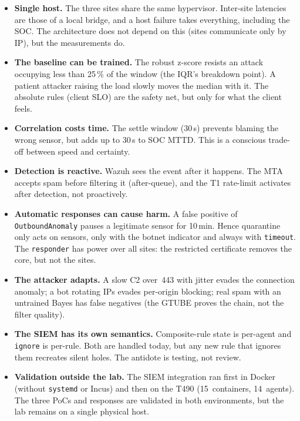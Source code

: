 \documentclass[11pt,a4paper]{article}
\begin{document}
\begin{itemize}
  \item \textbf{Single host.} The three sites share the same hypervisor. Inter-site latencies
    are those of a local bridge, and a host failure takes everything, including the SOC. The
    architecture does not depend on this (sites communicate only by IP), but the measurements
    do.
  \item \textbf{The baseline can be trained.} The robust z-score resists an attack occupying
    less than 25\,\% of the window (the IQR's breakdown point). A patient attacker raising
    the load slowly moves the median with it. The absolute rules (client SLO) are the safety
    net, but only for what the client feels.
  \item \textbf{Correlation costs time.} The settle window (30\,s) prevents blaming the wrong
    sensor, but adds up to 30\,s to SOC MTTD. This is a conscious trade-off between speed
    and certainty.
  \item \textbf{Detection is reactive.} Wazuh sees the event after it happens. The MTA
    accepts spam before filtering it (after-queue), and the T1 rate-limit activates after
    detection, not proactively.
  \item \textbf{Automatic responses can cause harm.} A false positive of
    \texttt{OutboundAnomaly} pauses a legitimate sensor for 10\,min. Hence quarantine only
    acts on sensors, only with the botnet indicator and always with \texttt{timeout}. The
    \texttt{responder} has power over all sites: the restricted certificate removes the core,
    but not the sites.
  \item \textbf{The attacker adapts.} A slow C2 over~443 with jitter evades the connection
    anomaly; a bot rotating IPs evades per-origin blocking; real spam with an untrained Bayes
    has false negatives (the GTUBE proves the chain, not the filter quality).
  \item \textbf{The SIEM has its own semantics.} Composite-rule state is per-agent and
    \texttt{ignore} is per-rule. Both are handled today, but any new rule that ignores them
    recreates silent holes. The antidote is testing, not review.
  \item \textbf{Validation outside the lab.} The SIEM integration ran first in Docker
    (without \texttt{systemd} or Incus) and then on the T490 (15~containers, 14~agents). The
    three PoCs and responses are validated in both environments, but the lab remains on a
    single physical host.
\end{itemize}
\end{document}
